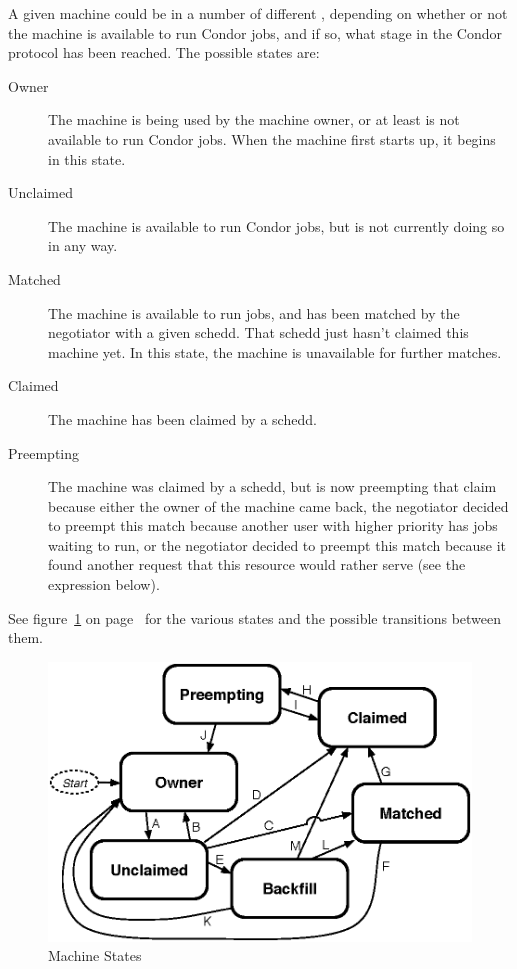 A given machine could be in a number of different ,
depending on whether or not the machine is available to run Condor
jobs, and if so, what stage in the Condor protocol has been reached.
The possible states are:

\begin{description}
  
\item[Owner] The machine is being used by the machine owner, or at
  least is not available to run Condor jobs.  When the machine first
  starts up, it begins in this state.
  
\item[Unclaimed] The machine is available to run Condor jobs, but is
  not currently doing so in any way.
  
\item[Matched] The machine is available to run jobs, and has been
  matched by the negotiator with a given schedd.  That schedd just
  hasn't claimed this machine yet.  In this state, the machine is
  unavailable for further matches.

\item[Claimed] The machine has been claimed by a schedd. 
  
\item[Preempting] The machine was claimed by a schedd, but is now
  preempting that claim because either the owner of the machine came
  back, the negotiator decided to preempt this match because another
  user with higher priority has jobs waiting to run, or the negotiator
  decided to preempt this match because it found another request that
  this resource would rather serve (see the  expression
  below).

\end{description}

See figure~\ref{fig:machine-states} on page~\pageref{fig:machine-states}
for the various states and the possible transitions between them.

\begin{figure}[hbt]
\centering
\includegraphics{admin-man/machine-states.eps}
\caption{\label{fig:machine-states}Machine States}
\end{figure}

